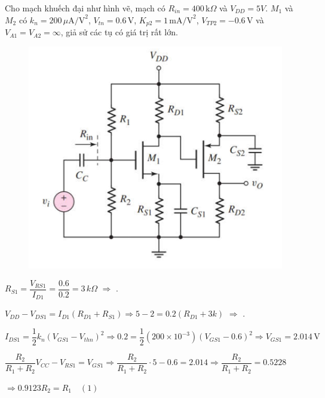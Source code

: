 
Cho mạch khuếch đại như hình vẽ, mạch có $R_{in} = 400\,\text{k}\Omega$ và $V_{DD} = 5V$. $M_{1}$ và $M_{2}$ có $k_{n} = 200\,\mu \text{A/V}^{2}$, $V_{tn} = 0.6\,\text{V}$, $K_{p2} = 1\,\text{mA/V}^{2}$, $V_{TP2} = -0.6\,\text{V}$ và $V_{A1} = V_{A2} = \infty$, giả sử các tụ có giá trị rất lớn.

\begin{figure}[H]
	\centering
	\includegraphics[width=.8\linewidth]{./my-chapters/my-images/Question8/debai.png}
\end{figure}


	$ R_{S1} = \dfrac{V_{RS1}}{I_{D1}} 
	= \dfrac{0.6}{0.2} 
	= 3\,k\Omega $ $\Rightarrow$ .
	
	\( V_{DD} - V_{DS1} = I_{D1} (R_{D1} + R_{S1}) 
	\Rightarrow 5 - 2 = 0.2 (R_{D1} + 3k) \) $\Rightarrow$ . 
	
	\( I_{DS1} = \dfrac{1}{2} k_n (V_{GS1} - V_{thn})^2 
	\Rightarrow 0.2 = \dfrac{1}{2} (200 \times 10^{-3}) (V_{GS1} - 0.6)^2 
	\Rightarrow V_{GS1} = 2.014\,\text{V} \)
	
	\( \dfrac{R_2}{R_1 + R_2} V_{CC} - V_{RS1} = V_{GS1} 
	\Rightarrow \dfrac{R_2}{R_1 + R_2} \cdot 5 - 0.6 = 2.014 
	\Rightarrow \dfrac{R_2}{R_1 + R_2} = 0.5228 \)
	
	\( \Rightarrow 0.9123 R_2 = R_1 \quad (1) \)
	
